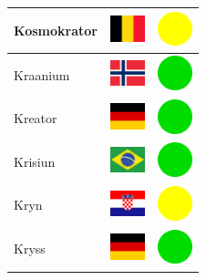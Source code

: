 \documentclass[12pt, a4paper, twoside]{report}
\begin{document}
\begin{center}
\begin{longtable}{|p{5cm}|p{2cm}|p{2cm}|}
 Kosmokrator                                                & \includegraphics[width=1cm]{../4x3/be} &   \includegraphics[width=1cm]{../likes/m} \\ \hline
 Kraanium                                                   & \includegraphics[width=1cm]{../4x3/no} &   \includegraphics[width=1cm]{../likes/y} \\ \hline
 Kreator                                                    & \includegraphics[width=1cm]{../4x3/de} &   \includegraphics[width=1cm]{../likes/y} \\ \hline
 Krisiun                                                    & \includegraphics[width=1cm]{../4x3/br} &   \includegraphics[width=1cm]{../likes/y} \\ \hline
 Kryn                                                       & \includegraphics[width=1cm]{../4x3/hr} &   \includegraphics[width=1cm]{../likes/m} \\ \hline
 Kryss                                                      & \includegraphics[width=1cm]{../4x3/de} &   \includegraphics[width=1cm]{../likes/y} \\ \hline

\end{longtable}
\end{center}
\end{document}
